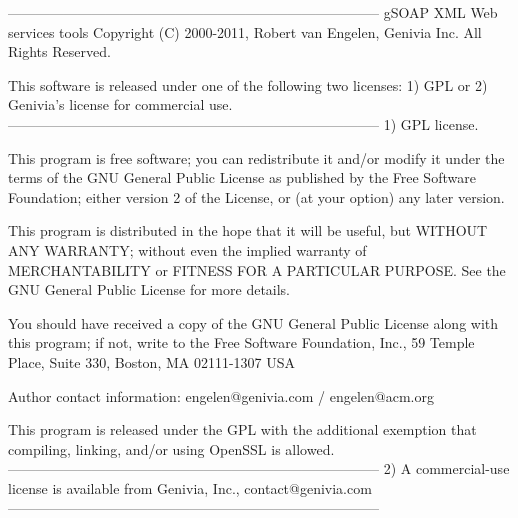 \begin{DoxyVerb}
--------------------------------------------------------------------------------
gSOAP XML Web services tools
Copyright (C) 2000-2011, Robert van Engelen, Genivia Inc. All Rights Reserved.

This software is released under one of the following two licenses:
1) GPL or 2) Genivia's license for commercial use.
--------------------------------------------------------------------------------
1) GPL license.

This program is free software; you can redistribute it and/or modify it under
the terms of the GNU General Public License as published by the Free Software
Foundation; either version 2 of the License, or (at your option) any later
version.

This program is distributed in the hope that it will be useful, but WITHOUT ANY
WARRANTY; without even the implied warranty of MERCHANTABILITY or FITNESS FOR A
PARTICULAR PURPOSE. See the GNU General Public License for more details.

You should have received a copy of the GNU General Public License along with
this program; if not, write to the Free Software Foundation, Inc., 59 Temple
Place, Suite 330, Boston, MA 02111-1307 USA

Author contact information:
engelen@genivia.com / engelen@acm.org

This program is released under the GPL with the additional exemption that
compiling, linking, and/or using OpenSSL is allowed.
--------------------------------------------------------------------------------
2) A commercial-use license is available from Genivia, Inc., contact@genivia.com
--------------------------------------------------------------------------------
\end{DoxyVerb}
 
